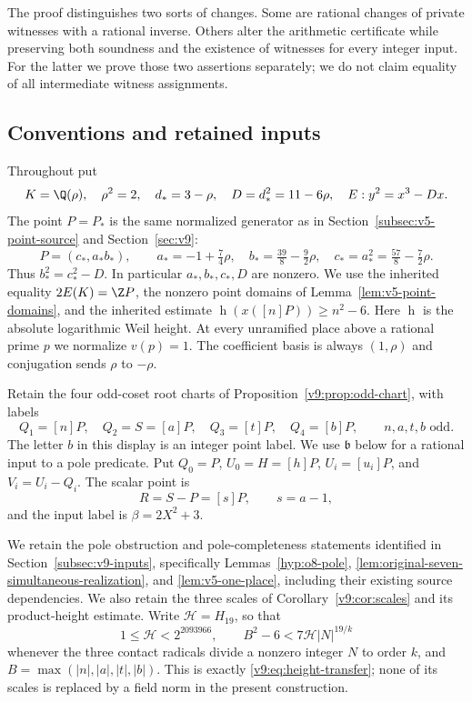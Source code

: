 The proof distinguishes two sorts of changes.  Some are rational
changes of private witnesses with a rational inverse.  Others alter
the arithmetic certificate while preserving both soundness and the
existence of witnesses for every integer input.  For the latter we
prove those two assertions separately; we do not claim equality of
all intermediate witness assignments.

\subsection{Conventions and retained inputs}\label{subsec:v12-inputs}

Throughout put
\[
 K=\Q(\rho),\quad \rho^2=2,\quad
 d_*=3-\rho,\quad D=d_*^2=11-6\rho,\quad
 E:y^2=x^3-Dx.
\]
The point $P=P_*$ is the same normalized generator as in
Section~\ref{subsec:v5-point-source} and Section~\ref{sec:v9}:
\[
 P=(c_*,a_*b_*),\qquad
 a_*=-1+\tfrac74\rho,\quad
 b_*=\tfrac{39}{8}-\tfrac92\rho,\quad
 c_*=a_*^2=\tfrac{57}{8}-\tfrac72\rho.
\]
Thus $b_*^2=c_*^2-D$.  In particular $a_*,b_*,c_*,D$ are nonzero.
We use the inherited equality $2E(K)=\Z P$, the nonzero point domains
of Lemma~\ref{lem:v5-point-domains}, and the inherited estimate
$\operatorname h(x([n]P))\ge n^2-6$.  Here $\operatorname h$ is the
absolute logarithmic Weil height.  At every unramified place above a
rational prime $p$ we normalize $v(p)=1$.  The coefficient basis is
always $(1,\rho)$ and conjugation sends $\rho$ to $-\rho$.

Retain the four odd-coset root charts of
Proposition~\ref{v9:prop:odd-chart}, with labels
\[
 Q_1=[n]P,\quad Q_2=S=[a]P,\quad
 Q_3=[t]P,\quad Q_4=[b]P,
 \qquad n,a,t,b\text{ odd}.
\]
The letter $b$ in this display is an integer point label.  We use
$\mathfrak b$ below for a rational input to a pole predicate.
Put $Q_0=P$, $U_0=H=[h]P$, $U_i=[u_i]P$, and
$V_i=U_i-Q_i$.  The scalar point is
\[
 R=S-P=[s]P,\qquad s=a-1,
\]
and the input label is $\beta=2X^2+3$.

We retain the pole obstruction and pole-completeness statements
identified in Section~\ref{subsec:v9-inputs}, specifically
Lemmas~\ref{hyp:o8-pole}, \ref{lem:original-seven-simultaneous-realization},
and \ref{lem:v5-one-place}, including their existing source dependencies.
We also retain the three scales of Corollary~\ref{v9:cor:scales} and
its product-height estimate.  Write $\mathcal H=H_{19}$, so that
\begin{equation}\label{eq:v12-height-input}
 1\le\mathcal H<2^{2093966},\qquad
 B^2-6<7\mathcal H|N|^{19/k}
\end{equation}
whenever the three contact radicals divide a nonzero integer $N$
to order $k$, and $B=\max(|n|,|a|,|t|,|b|)$.
This is exactly \eqref{v9:eq:height-transfer}; none of its scales is
replaced by a field norm in the present construction.


